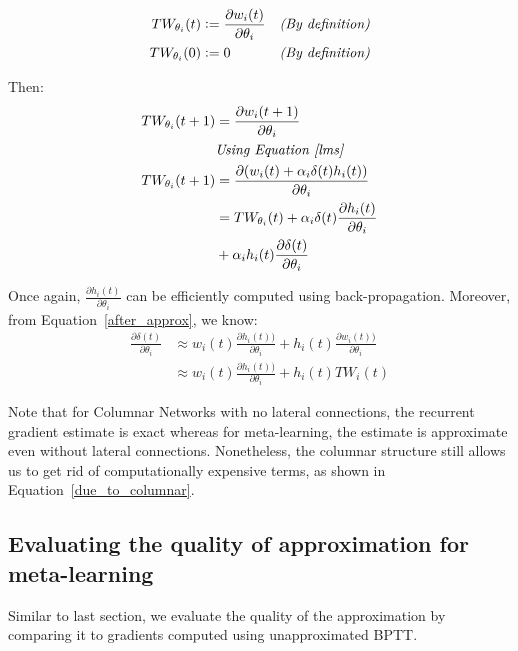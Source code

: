 \documentclass{article}
\begin{document}
\begin{align}
 TW_{\theta_i}(t)  & \vcentcolon = \frac{\partial w_i(t)}{\partial \theta_i}  && \textit{(By definition)} \label{defw_1}\\
 TW_{\theta_i}(0)  & \vcentcolon = 0  && \textit{(By definition)} \label{defw_2} 
\end{align}

Then: 
\begin{align}
TW_{\theta_i}(t+1)   & = \frac{\partial w_i(t+1)}{\partial \theta_i}   \notag \\
& \textit{Using Equation~\ref{lms}}  \notag \\
TW_{\theta_i}(t+1)   & = \frac{\partial (w_i(t) + \alpha_i \delta(t) h_i(t))}{\partial \theta_i}  \label{use_lms} \\
&= TW_{\theta_i}(t) +   \alpha_i \delta(t)  \frac{\partial h_i(t)}{\partial \theta_i} \notag \\ 
& + \alpha_i h_i(t)  \frac{\partial \delta(t)}{\partial \theta_i} \notag \\
\end{align}

Once again, $\frac{\partial h_i(t)}{\partial \theta_i}$ can be efficiently computed using back-propagation. Moreover, from Equation~\ref{after_approx}, we know:
\begin{align}
    \frac{\partial \delta(t)}{\partial \theta_i} &\approx   w_i(t)\frac{\partial  h_i(t))}{ \partial \theta_i} +  h_i(t)\frac{\partial  w_i(t))}{ \partial \theta_i} \\
    &\approx w_i(t)\frac{\partial  h_i(t))}{ \partial \theta_i} +  h_i(t) TW_i(t)
\end{align}


Note that for Columnar Networks with no lateral connections, the recurrent gradient estimate is exact whereas for meta-learning, the estimate is approximate even without lateral connections. Nonetheless, the columnar structure still allows us to get rid of computationally expensive terms, as shown in Equation~\ref{due_to_columnar}.
\subsection{Evaluating the quality of approximation for meta-learning}
Similar to last section, we evaluate the quality of the approximation by comparing it to gradients computed using unapproximated BPTT. 
\end{document}
